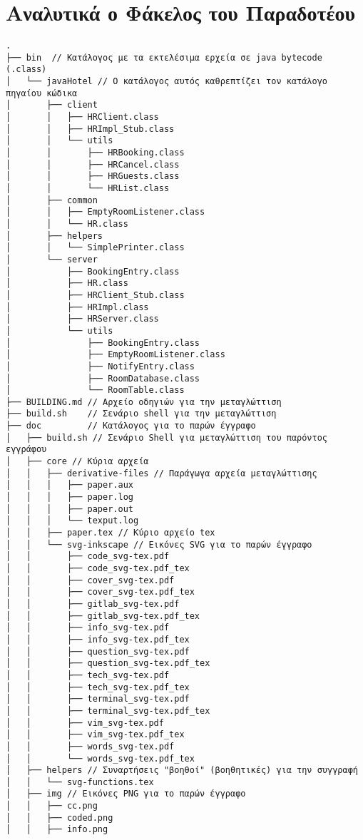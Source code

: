 \section{Αναλυτικά ο Φάκελος του Παραδοτέου}
\footnotesize
\begin{verbatim}
.
├── bin  // Κατάλογος με τα εκτελέσιμα ερχεία σε java bytecode (.class)
│   └── javaHotel // Ο κατάλογος αυτός καθρεπτίζει τον κατάλογο πηγαίου κώδικα
│       ├── client
│       │   ├── HRClient.class
│       │   ├── HRImpl_Stub.class
│       │   └── utils
│       │       ├── HRBooking.class
│       │       ├── HRCancel.class
│       │       ├── HRGuests.class
│       │       └── HRList.class
│       ├── common
│       │   ├── EmptyRoomListener.class
│       │   └── HR.class
│       ├── helpers
│       │   └── SimplePrinter.class
│       └── server
│           ├── BookingEntry.class
│           ├── HR.class
│           ├── HRClient_Stub.class
│           ├── HRImpl.class
│           ├── HRServer.class
│           └── utils
│               ├── BookingEntry.class
│               ├── EmptyRoomListener.class
│               ├── NotifyEntry.class
│               ├── RoomDatabase.class
│               └── RoomTable.class
├── BUILDING.md // Αρχείο οδηγιών για την μεταγλώττιση
├── build.sh    // Σενάριο shell για την μεταγλώττιση
├── doc         // Κατάλογος για το παρών έγγραφο
│   ├── build.sh // Σενάριο Shell για μεταγλώττιση του παρόντος εγγράφου
│   ├── core // Κύρια αρχεία
│   │   ├── derivative-files // Παράγωγα αρχεία μεταγλώττισης
│   │   │   ├── paper.aux
│   │   │   ├── paper.log
│   │   │   ├── paper.out
│   │   │   └── texput.log
│   │   ├── paper.tex // Κύριο αρχείο tex
│   │   └── svg-inkscape // Εικόνες SVG για το παρών έγγραφο
│   │       ├── code_svg-tex.pdf
│   │       ├── code_svg-tex.pdf_tex
│   │       ├── cover_svg-tex.pdf
│   │       ├── cover_svg-tex.pdf_tex
│   │       ├── gitlab_svg-tex.pdf
│   │       ├── gitlab_svg-tex.pdf_tex
│   │       ├── info_svg-tex.pdf
│   │       ├── info_svg-tex.pdf_tex
│   │       ├── question_svg-tex.pdf
│   │       ├── question_svg-tex.pdf_tex
│   │       ├── tech_svg-tex.pdf
│   │       ├── tech_svg-tex.pdf_tex
│   │       ├── terminal_svg-tex.pdf
│   │       ├── terminal_svg-tex.pdf_tex
│   │       ├── vim_svg-tex.pdf
│   │       ├── vim_svg-tex.pdf_tex
│   │       ├── words_svg-tex.pdf
│   │       └── words_svg-tex.pdf_tex
│   ├── helpers // Συναρτήσεις "βοηθοί" (βοηθητικές) για την συγγραφή
│   │   └── svg-functions.tex
│   ├── img // Εικόνες PNG για το παρών έγγραφο
│   │   ├── cc.png
│   │   ├── coded.png
│   │   ├── info.png

\end{verbatim}
